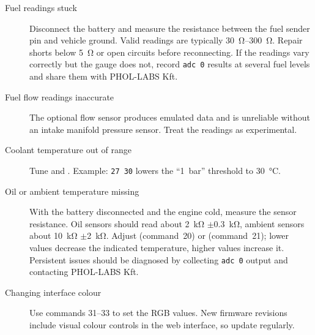 \begin{description}
    \item[Fuel readings stuck] Disconnect the battery and measure the resistance between the fuel sender pin and vehicle ground. Valid readings are typically \SIrange{30}{300}{\ohm}. Repair shorts below \SI{5}{\ohm} or open circuits before reconnecting. If the readings vary correctly but the gauge does not, record \verb|adc 0| results at several fuel levels and share them with PHOL-LABS Kft.
    \item[Fuel flow readings inaccurate] The optional flow sensor produces emulated data and is unreliable without an intake manifold pressure sensor. Treat the readings as experimental.
    \item[Coolant temperature out of range] Tune  and . Example: \verb|27 30| lowers the ``1~bar'' threshold to \SI{30}{\celsius}.
    \item[Oil or ambient temperature missing] With the battery disconnected and the engine cold, measure the sensor resistance. Oil sensors should read about \SI{2}{\kilo\ohm} \ensuremath{\pm}\SI{0.3}{\kilo\ohm}, ambient sensors about \SI{10}{\kilo\ohm} \ensuremath{\pm}\SI{2}{\kilo\ohm}. Adjust  (command~20) or  (command~21); lower values decrease the indicated temperature, higher values increase it. Persistent issues should be diagnosed by collecting \verb|adc 0| output and contacting PHOL-LABS Kft.
    \item[Changing interface colour] Use commands 31--33 to set the RGB values. New firmware revisions include visual colour controls in the web interface, so update regularly.
\end{description}
